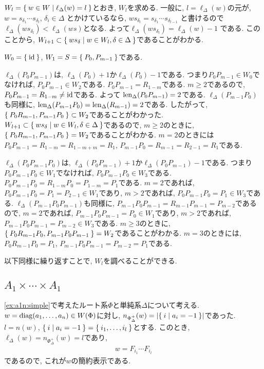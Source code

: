 $W_l=\Set{w\in W|\ell_\Delta(w)=l}$とおき,
$W_l$を求める.
一般に, $l=\ell_\Delta(w)$の元が, $w=s_{\delta_1}\cdots s_{\delta_l}$, $\delta_i\in\Delta$
とかけているなら, $ws_{\delta_l}=s_{\delta_1}\cdots s_{\delta_{l-1}}$
と書けるので$\ell_\Delta(ws_{\delta_l})<\ell_\Delta(ws)$となる.
よって$\ell_\Delta(ws_{\delta_l})=\ell_\Delta(w)-1$
である.
このことから,
$W_{l+1}\subset \Set{ws_\delta|w\in W_l,\delta\in\Delta}$であることがわかる.

$W_0=\Set{\operatorname{id}}$, $W_{1}=S=\Set{P_0,P_{m-1}}$である.

$\ell_\Delta(P_0P_{m-1})$は,
$\ell_\Delta(P_0)+1$か$\ell_\Delta(P_0)-1$である.
つまり$P_0P_{m-1}\in W_0$でなければ, $P_0P_{m-1}\in W_2$である.
$P_0P_{m-1}=R_{1-m}$である.
$m\geq 2$であるので, $P_0P_{m-1}=R_{1-m}\neq \operatorname{id}$である.
よって
$\operatorname{len}_\Delta(P_0P_{m-1})=2$である.
$\ell_\Delta(P_{m-1}P_0)$も同様に,
$\operatorname{len}_\Delta(P_{m-1}P_0)=\operatorname{len}_\Delta(R_{m-1})=2$である.
したがって, $\Set{P_0R_{m-1},P_{m-1}P_0}\subset W_2$であることがわかった.
$W_{l+1}\subset \Set{ws_\delta|w\in W_l,\delta\in\Delta}$であるので,
 $m\geq 2$のときに, $\Set{P_0R_{m-1},P_{m-1}P_0}= W_2$であることがわかる.
$m=2$のときには$P_0P_{m-1}=R_{1-m}=R_{1-m+m}=R_{1}$,
$P_{m-1}P_0=R_{m-1}=R_{2-1}=R_{1}$である.

$\ell_\Delta(P_0P_{m-1}P_0)$は,
$\ell_\Delta(P_0P_{m-1})+1$か$\ell_\Delta(P_0P_{m-1})-1$である.
つまり$P_0P_{m-1}P_0\in W_1$でなければ, $P_0P_{m-1}P_0\in W_3$である.
$P_0P_{m-1}P_0=R_{1-m}P_0=P_{1-m}=P_1$である.
$m=2$であれば, $P_0P_{m-1}P_0=P_{1}=P_{2-1}\in W_1$であり,
$m>2$であれば, $P_0P_{m-1}P_0=P_1\in W_3$である.
$\ell_\Delta(P_{m-1}P_0P_{m-1})$も同様に,
$P_{m-1}P_0P_{m-1}=R_{m-1}P_{m-1}=P_{m-2}$であるので,
$m=2$であれば, $P_{m-1}P_0P_{m-1}=P_{0}\in W_1$であり,
$m>2$であれば, $P_{m-1}P_0P_{m-1}=P_{m-2}\in W_3$である.
$m\geq 3$のときに, $\Set{P_0R_{m-1}P_0,P_{m-1}P_0P_{m-1}}= W_2$であることがわかる.
$m=3$のときには,  $P_0R_{m-1}P_0=P_1$, $P_{m-1}P_0P_{m-1}=P_{m-2}=P_1$である.


以下同様に繰り返すことで, $W_l$を調べることができる.


\subsection{$A_{1}\times\cdots\times A_{1}$}
\cref{ex:a1n:simple}で考えたルート系$\Phi$と単純系$\Delta$について考える.
$w=\operatorname{diag}(a_1,\ldots,a_n)\in W(\Phi)$に対し,
$n_{\Phi_\Delta^+}(w)=\left|\Set{i|a_i=-1}\right|$であった.
$l=n(w)$,
$\Set{i|a_i=-1}=\Set{i_1,\ldots,i_l}$とする.
このとき, $\ell_\Delta(w)=n_{\Phi_\Delta^+}(w)=l$であり,
\begin{align*}
w=F_{i_1}\cdots F_{i_l}
\end{align*}
であるので, これが$w$の簡約表示である.


